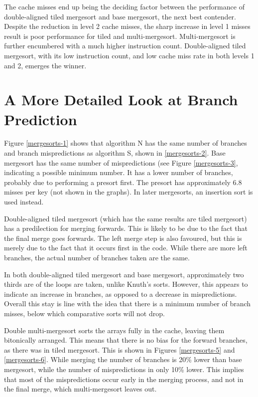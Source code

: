 The cache misses end up being the deciding factor between the performance of
double-aligned tiled mergesort and base mergesort, the next best contender.
Despite the reduction in level 2 cache misses, the sharp increase in level 1
misses result is poor performance for tiled and multi-mergesort. Multi-mergesort
is further encumbered with a much higher instruction count. Double-aligned tiled
mergesort, with its low instruction count, and low cache miss rate in both
levels 1 and 2, emerges the winner.

\section{A More Detailed Look at Branch Prediction}


Figure \ref{mergesorts-1} shows that algorithm N has the same number of branches
and branch mispredictions as algorithm S, shown in \ref{mergesorts-2}. Base
mergesort has the same number of mispredictions (see Figure \ref{mergesorts-3},
indicating a possible minimum number. It has a lower number of branches,
probably due to performing a presort first. The presort has approximately 6.8
misses per key (not shown in the graphs). In later mergesorts, an insertion sort
is used instead.

Double-aligned tiled mergesort (which has the same results are tiled mergesort) has a
predilection for merging forwards. This is likely to be due to the fact that the
final merge goes forwards. The left merge step is also favoured, but this is
merely due to the fact that it occurs first in the code. While there are more
left branches, the actual number of branches taken are the same.

In both double-aligned tiled mergesort and base mergesort, approximately two thirds are
of the loops are taken, unlike Knuth's sorts. However, this appears to indicate
an increase in branches, as opposed to a decrease in mispredictions. Overall
this stay is line with the idea that there is a minimum number of branch misses,
below which comparative sorts will not drop.

Double multi-mergesort sorts the arrays fully in the cache, leaving them
bitonically arranged. This means that there is no bias for the forward branches,
as there was in tiled mergesort. This is shown in Figures \ref{mergesorts-5} and
\ref{mergesorts-6}. While merging the number of branches is 20\% lower than base
mergesort, while the number of mispredictions in only 10\% lower. This implies
that most of the mispredictions occur early in the merging process, and not in
the final merge, which multi-mergesort leaves out.

